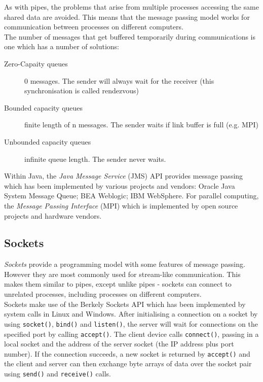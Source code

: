 As with pipes, the problems that arise from multiple processes accessing the same shared data are avoided. This means that the message passing model works for communication between processes on different computers.\\

The number of messages that get buffered temporarily during communications is one which has a number of solutions:
\begin{description}
    \item[Zero-Capaity queues] 0 messages. The sender will always wait for the receiver (this synchronisation is called rendezvous)
    \item[Bounded capacity queues] finite length of n messages. The sender waits if link buffer is full (e.g. MPI) 
    \item[Unbounded capacity queues] infinite queue length. The sender never waits.  
\end{description}

Within Java, the \textit{Java Message Service} (JMS) API provides message passing which has been implemented by various projects and vendors: Oracle Java System Message Queue; BEA Weblogic; IBM WebSphere. For parallel computing, the \textit{Message Passing Interface} (MPI) which is implemented by open source projects and hardware vendors.

\subsection{Sockets}
\textit{Sockets} provide a programming model with some features of message passing. However they are most commonly used for stream-like communication. This makes them similar to pipes, except unlike pipes - sockets can connect to unrelated processes, including processes on different computers.\\

Sockets make use of the Berkely Sockets API which has been implemented by system calls in Linux and Windows. After initialising a connection on a socket by using \verb|socket()|, \verb|bind()| and \verb|listen()|, the server will wait for connections on the specified port by calling \verb|accept()|. The client device calls \verb|connect()|, passing in a local socket and the address of the server socket (the IP address plus port number). If the connection succeeds, a new socket is returned by \verb|accept()| and the client and server can then exchange byte arrays of data over the socket pair using \verb|send()| and \verb|receive()| calls.

